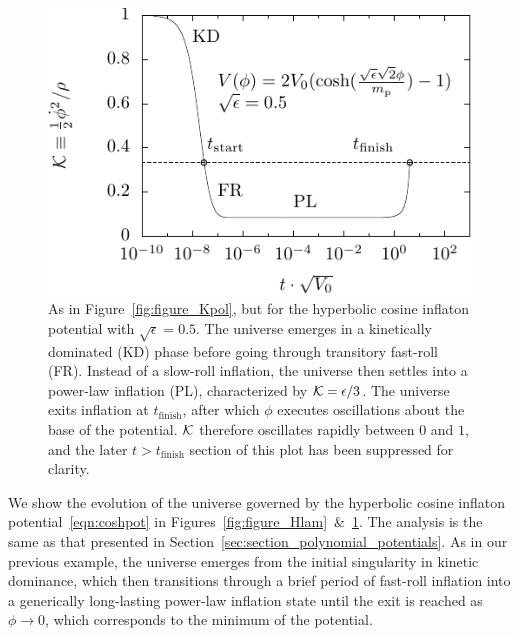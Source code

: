 %
\begin{figure}[tp]
  \includegraphics[width=\textwidth]{chapters/kinetic_dominance/figures/Klam}
  \caption{As in Figure~\protect\ref{fig:figure_Kpol}, but for the hyperbolic cosine inflaton potential with \(\sqrt{\epsilon}=0.5\). The universe emerges in a kinetically dominated (KD) phase before going through transitory fast-roll (FR). Instead of a slow-roll inflation, the universe then settles into a power-law inflation (PL), characterized by \(\mathcal{K}=\epsilon/3\). The universe exits inflation at \(t_\mathrm{finish}\), after which \(\phi\) executes oscillations about the base of the potential. \(\mathcal{K}\) therefore oscillates rapidly between \(0\) and \(1\), and the later \(t>t_\mathrm{finish}\) section of this plot has been suppressed for clarity.}\label{fig:figure_Klam}
\end{figure}
%

We show the evolution of the universe governed by the hyperbolic cosine inflaton potential~\eqref{eqn:coshpot} in Figures~\ref{fig:figure_Hlam}~\&~\ref{fig:figure_Klam}. The analysis is the same as that presented in Section~\ref{sec:section_polynomial_potentials}.  As in our previous example, the universe emerges from the initial singularity in kinetic dominance, which then transitions through a brief period of fast-roll inflation into a generically long-lasting power-law inflation state until the exit is reached as \(\phi\rightarrow0\), which corresponds to the minimum of the potential.  

